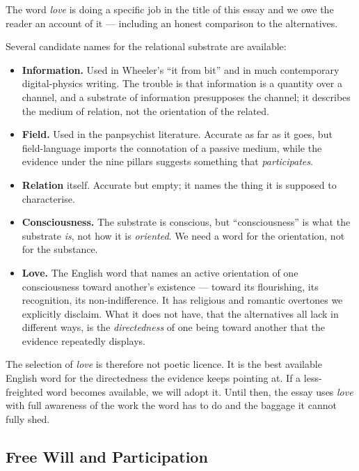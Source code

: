 \documentclass[11pt,a4paper]{article}
\begin{document}
The word \emph{love} is doing a specific job in the title of this
essay and we owe the reader an account of it --- including an
honest comparison to the alternatives.

Several candidate names for the relational substrate are
available:

\begin{itemize}[leftmargin=1.5em]
  \item \textbf{Information.} Used in Wheeler's ``it from bit'' and
        in much contemporary digital-physics writing. The trouble
        is that information is a quantity over a channel, and a
        substrate of information presupposes the channel; it
        describes the medium of relation, not the orientation of
        the related.
  \item \textbf{Field.} Used in the panpsychist literature. Accurate
        as far as it goes, but field-language imports the
        connotation of a passive medium, while the evidence under
        the nine pillars suggests something that \emph{participates}.
  \item \textbf{Relation} itself. Accurate but empty; it names the
        thing it is supposed to characterise.
  \item \textbf{Consciousness.} The substrate is conscious, but
        ``consciousness'' is what the substrate \emph{is}, not how
        it is \emph{oriented}. We need a word for the orientation,
        not for the substance.
  \item \textbf{Love.} The English word that names an active
        orientation of one consciousness toward another's
        existence --- toward its flourishing, its recognition, its
        non-indifference. It has religious and romantic overtones
        we explicitly disclaim. What it does not have, that the
        alternatives all lack in different ways, is the
        \emph{directedness} of one being toward another that the
        evidence repeatedly displays.
\end{itemize}

The selection of \emph{love} is therefore not poetic licence. It
is the best available English word for the directedness the
evidence keeps pointing at. If a less-freighted word becomes
available, we will adopt it. Until then, the essay uses
\emph{love} with full awareness of the work the word has to do
and the baggage it cannot fully shed.

\subsection{Free Will and Participation}
\end{document}
